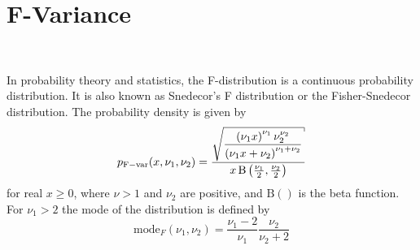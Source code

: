 \clearpage

\section{F-Variance} ~\\
\label{sec:FVariance}

In probability theory and statistics, the
F-distribution is a continuous probability distribution. It is also
known as Snedecor's F distribution or the Fisher-Snedecor
distribution. The probability density is given by
\begin{equation}
p_\mathrm{F-var}(x,\nu_1,\nu_2) =
\frac{\DS \sqrt{\frac{\left(\nu_1 x\right)^{\nu_1} \nu_2^{\nu_2}}{\left(\nu_1 x+\nu_2\right)^{\nu_1+\nu_2}}}}{x\,\mathrm{B}\left(\frac{\nu_1}{2},\frac{\nu_2}{2}\right)}
\end{equation}
for real $x\geq 0$, where $\nu>1$ and $\nu_2$ are positive,
and $\mathrm{B}()$  is the beta function.
For $\nu_1>2$ the mode of the distribution is defined by
\begin{equation}
\mathrm{mode}_F(\nu_1,\nu_2)=\frac{\nu_1-2}{\nu_1}\frac{\nu_2}{\nu_2+2}
\end{equation}
\vspace{5mm}

